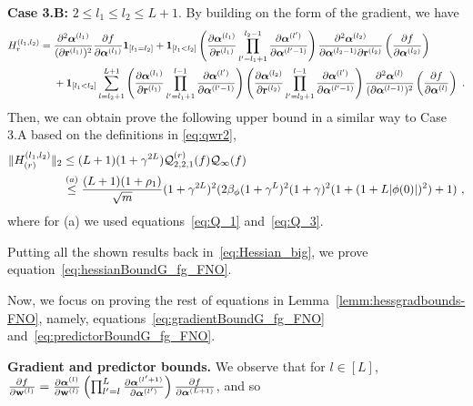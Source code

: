 {\bf Case 3.B:} $2 \leq l_1 \leq l_2 \leq L+1$. By building on the form of the gradient, we have 
\begin{align*}
H_{r}^{(l_1,l_2)} & = \frac{\partial^2 \boldsymbol{\alpha}^{(l_1)}}{(\partial \mathbf{r}^{(l_1)})^2} \frac{\partial f}{\partial \boldsymbol{\alpha}^{(l_1)}} \bm{1}_{[l_1 =l_2]} +  \bm{1}_{[l_1 <l_2]}\left( \frac{\partial \boldsymbol{\alpha}^{(l_1)}}{\partial \mathbf{r}^{(l_1)}}  \prod_{l'=l_1+1}^{l_2-1} \frac{\partial \boldsymbol{\alpha}^{(l')}}{\partial \boldsymbol{\alpha}^{(l'-1)}} \right) \frac{\partial^2 \boldsymbol{\alpha}^{(l_2)}}{\partial \boldsymbol{\alpha}^{(l_2-1)} \partial \mathbf{r}^{(l_2)}} \left(\frac{\partial f}{\partial \boldsymbol{\alpha}^{(l_2)}} \right) \\
& ~~~~ + \bm{1}_{[l_1 <l_2]}\sum_{l=l_2+1}^{L+1} \left( \frac{\partial \boldsymbol{\alpha}^{(l_1)}}{\partial \mathbf{r}^{(l_1)}} \prod_{l'=l_1+1}^{l-1} \frac{\partial \boldsymbol{\alpha}^{(l')}}{\partial \boldsymbol{\alpha}^{(l'-1)}} \right)  \left( \frac{\partial \boldsymbol{\alpha}^{(l_2)}}{\partial \mathbf{r}^{(l_2)}} \prod_{l'=l_2+1}^{l-1} \frac{\partial \boldsymbol{\alpha}^{(l')}}{\partial \boldsymbol{\alpha}^{(l'-1)}} \right) \frac{\partial^2 \boldsymbol{\alpha}^{(l)}}{(\partial \boldsymbol{\alpha}^{(l-1)})^2}  \left(\frac{\partial f}{\partial \boldsymbol{\alpha}^{(l)}} \right) ~. 
\end{align*}
Then, we can obtain  prove the following upper bound in a similar way to Case 3.A based on the definitions in \eqref{eq:qwr2},
\begin{align*}
 \| H_{(r)}^{(l_1,l_2)} \|_2 &\leq (L+1)(1+\gamma^{2L}) {\cal Q}^{(r)}_{2,2,1}(f) {\cal Q}_{\infty}(f)\\
 &\overset{(a)}{\leq}
 \frac{(L+1)(1+\rho_1)}{\sqrt{m}}(1+\gamma^{2L})^2(2\beta_{\phi}(1+\gamma^L)^2(1+\gamma)^2(1+(1+L|\phi(0)|)^2)+1)
 ~,
\end{align*}
where for (a) we used equations~\eqref{eq:Q_1} and~\eqref{eq:Q_3}.


Putting all the shown results back in~\eqref{eq:Hessian_big}, we prove equation~\eqref{eq:hessianBoundG_fg_FNO}.  



Now, we focus on proving the rest of equations in Lemma~\ref{lemm:hessgradbounds-FNO}, namely, equations~\eqref{eq:gradientBoundG_fg_FNO} and~\eqref{eq:predictorBoundG_fg_FNO}. 

{\bf Gradient and predictor bounds.} 
%
We observe that for $l\in[L]$,
$
\frac{\partial f}{\partial \mathbf{w}^{(l)}} = \frac{\partial \boldsymbol{\alpha}^{(l)}}{\partial \mathbf{w}^{(l)}}  \left( \prod_{l'=l}^L \frac{\partial \boldsymbol{\alpha}^{(l'+1)}}{\partial \boldsymbol{\alpha}^{(l')}} \right) \frac{\partial f}{\partial \boldsymbol{\alpha}^{(L+1)}}
$, and so


